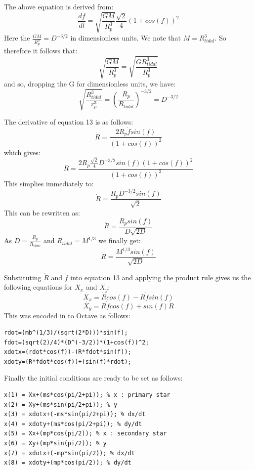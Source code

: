 \documentclass[a4paper,12pt]{article}
\begin{document}
The above equation is derived from:
\begin{equation}
\frac{df}{dt}=\sqrt{\frac{GM}{R_p^3}}\frac{\sqrt{2}}{4}(1+cos(f))^2
\end{equation}
Here the $\frac{GM}{R_p^3}=D^{-3/2}$ in dimensionless units. We note that $M=R_{tidal}^3$. So therefore it follows that:
\begin{equation}
\sqrt{\frac{GM}{R_p^3}}=\sqrt{\frac{GR_{tidal}^3}{R_p^3}}
\end{equation}
and so, dropping the G for dimensionless units, we have:
\begin{equation}
\sqrt{\frac{R_{tidal}^3}{r_p^3}}=\left(\frac{R_p}{R_{tidal}}\right)^{-3/2}=D^{-3/2}
\end{equation}

The derivative of equation 13 is as follows:
\begin{equation}
\dot{R}=\frac{2R_p\dot{f}sin(f)}{(1+cos(f))^2}
\end{equation}
which gives:
\begin{equation}
\dot{R}=\frac{2R_p\frac{\sqrt{2}}{4}D^{-3/2}sin(f)(1+cos(f))^2}{(1+cos(f))^2}
\end{equation}
This simplies immediately to:
\begin{equation}
\dot{R}=\frac{R_pD^{-3/2}sin(f)}{\sqrt{2}}
\end{equation}
This can be rewritten as:
\begin{equation}
\dot{R}=\frac{R_psin(f)}{D\sqrt{2D}}
\end{equation}
As $D=\frac{R_p}{R_{tidal}}$ and $R_{tidal}=M^{1/3}$ we finally get:
\begin{equation}
\dot{R}=\frac{M^{1/3}sin(f)}{\sqrt{2D}}
\end{equation}

Substituting $\dot{R}$ and $\dot{f}$ into equation 13 and applying the product rule gives us the following equations for $\dot{X_x}$ and $\dot{X_y}$:
\begin{equation}
\dot{X_x}=\dot{R}cos(f)-R\dot{f}sin(f)
\end{equation}
\begin{equation}
\dot{X_y}=R\dot{f}cos(f)+sin(f)\dot{R}
\end{equation}
This was encoded in to Octave as follows:
\begin{lstlisting}
rdot=(mb^(1/3)/(sqrt(2*D)))*sin(f);
fdot=(sqrt(2)/4)*(D^(-3/2))*(1+cos(f))^2;
xdotx=(rdot*cos(f))-(R*fdot*sin(f));
xdoty=(R*fdot*cos(f))+(sin(f)*rdot);
\end{lstlisting}
Finally the initial conditions are ready to be set as follows:
\begin{lstlisting}
x(1) = Xx+(ms*cos(pi/2+pi)); % x : primary star
x(2) = Xy+(ms*sin(pi/2+pi)); % y
x(3) = xdotx+(-ms*sin(pi/2+pi)); % dx/dt
x(4) = xdoty+(ms*cos(pi/2+pi)); % dy/dt
x(5) = Xx+(mp*cos(pi/2)); % x : secondary star
x(6) = Xy+(mp*sin(pi/2)); % y
x(7) = xdotx+(-mp*sin(pi/2)); % dx/dt
x(8) = xdoty+(mp*cos(pi/2)); % dy/dt
\end{lstlisting}
\end{document}

